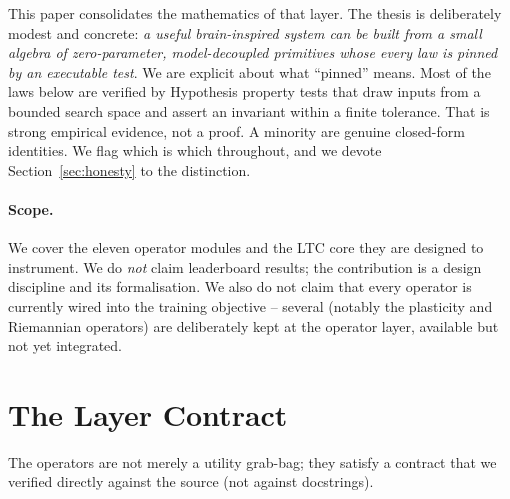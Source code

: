 \documentclass[11pt]{article}
\theoremstyle{definition}
\begin{document}
This paper consolidates the mathematics of that layer. The thesis is
deliberately modest and concrete: \emph{a useful brain-inspired system can
be built from a small algebra of zero-parameter, model-decoupled primitives
whose every law is pinned by an executable test}. We are explicit about what
``pinned'' means. Most of the laws below are verified by Hypothesis
property tests that draw inputs from a bounded search space and assert an
invariant within a finite tolerance. That is strong empirical evidence, not
a proof. A minority are genuine closed-form identities. We flag which is
which throughout, and we devote Section~\ref{sec:honesty} to the
distinction.

\paragraph{Scope.} We cover the eleven operator modules and the LTC core
they are designed to instrument. We do \emph{not} claim leaderboard
results; the contribution is a design discipline and its formalisation. We
also do not claim that every operator is currently wired into the training
objective -- several (notably the plasticity and Riemannian operators) are
deliberately kept at the operator layer, available but not yet integrated.

\section{The Layer Contract}\label{sec:contract}
The operators are not merely a utility grab-bag; they satisfy a contract
that we verified directly against the source (not against docstrings).
\end{document}
